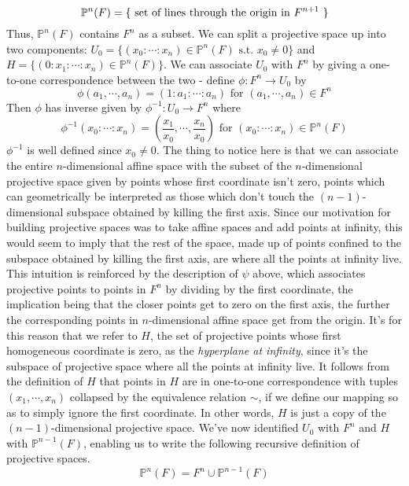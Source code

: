 \documentclass{article}
\newcommand*{\ti}{\textit}
\newcommand*{\nn}{\newline \newline}
\begin{document}
$$ \mathbb{P}^n(F) = \{ \text{ set of lines through the origin in $ F^{n + 1} $ } \} $$
Thus, $ \mathbb{P}^n(F) $ contains $ F^n $ as a subset.
\nn
We can split a projective space up into two components: $ U_0 = \{ (x_0 : \cdots : x_n) \in \mathbb{P}^n(F) \text{ s.t. } x_0 \neq 0 \} $ and $ H = \{ (0 : x_1 : \cdots : x_n) \in \mathbb{P}^n(F) \} $. We can associate $ U_0 $ with $ F^n $ by giving a one-to-one correspondence between the two - define $ \phi: F^n \rightarrow U_0 $ by
$$ \phi(a_1, \cdots, a_n) = (1 : a_1 : \cdots : a_n) \text{ for } (a_1, \cdots, a_n) \in F^n $$
Then $ \phi $ has inverse given by $ \phi^{-1}: U_0 \rightarrow F^n $ where
$$ \phi^{-1}(x_0 : \cdots : x_n) = \left( \frac{x_1}{x_0}, \cdots, \frac{x_n}{x_0} \right) \text{ for } (x_0 : \cdots : x_n) \in \mathbb{P}^n(F) $$
$ \phi^{-1} $ is well defined since $ x_0 \neq 0 $. The thing to notice here is that we can associate the entire $ n $-dimensional affine space with the subset of the $ n $-dimensional projective space given by points whose first coordinate isn't zero, points which can geometrically be interpreted as those which don't touch the $ (n - 1) $-dimensional subspace obtained by killing the first axis. Since our motivation for building projective spaces was to take affine spaces and add points at infinity, this would seem to imply that the rest of the space, made up of points confined to the subspace obtained by killing the first axis, are where all the points at infinity live. This intuition is reinforced by the description of $ \psi $ above, which associates projective points to points in $ F^n $ by dividing by the first coordinate, the implication being that the closer points get to zero on the first axis, the further the corresponding points in $ n $-dimensional affine space get from the origin. It's for this reason that we refer to $ H $, the set of projective points whose first homogeneous coordinate is zero, as the \ti{hyperplane at infinity}, since it's the subspace of projective space where all the points at infinity live.
\nn
It follows from the definition of $ H $ that points in $ H $ are in one-to-one correspondence with tuples $ (x_1, \cdots, x_n) $ collapsed by the equivalence relation $ \sim $, if we define our mapping so as to simply ignore the first coordinate. In other words, $ H $ is just a copy of the $ (n - 1) $-dimensional projective space. We've now identified $ U_0 $ with $ F^n $ and $ H $ with $ \mathbb{P}^{n - 1}(F) $, enabling us to write the following recursive definition of projective spaces.
$$ \mathbb{P}^n(F) = F^n \cup \mathbb{P}^{n - 1}(F) $$
\end{document}
